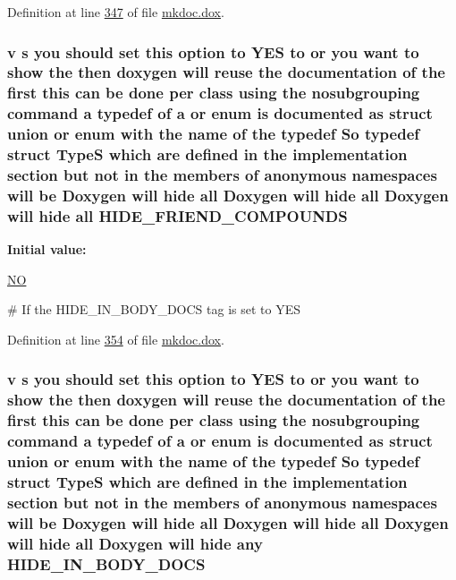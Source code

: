 Definition at line \hyperlink{mkdoc_8dox_source_l00347}{347} of file \hyperlink{mkdoc_8dox_source}{mkdoc.\-dox}.

\hypertarget{mkdoc_8dox_a90cb1e2bfb8402bdac3320203fe5276a}{
\subsubsection[{H\-I\-D\-E\-\_\-\-F\-R\-I\-E\-N\-D\-\_\-\-C\-O\-M\-P\-O\-U\-N\-D\-S}]{\setlength{\rightskip}{0pt plus 5cm}v s you should set this option to Y\-E\-S to or you want to show the then doxygen will reuse the documentation of the first this can be done per class using the nosubgrouping command a typedef of a or enum is documented as {\bf struct} {\bf union} or enum with the name of the typedef So typedef {\bf struct} {\bf Type\-S} which {\bf are} defined in the implementation section but not in the members of anonymous namespaces will be Doxygen will hide all Doxygen will hide all Doxygen will hide all H\-I\-D\-E\-\_\-\-F\-R\-I\-E\-N\-D\-\_\-\-C\-O\-M\-P\-O\-U\-N\-D\-S}}\label{mkdoc_8dox_a90cb1e2bfb8402bdac3320203fe5276a}
{\bfseries Initial value\-:}
\begin{DoxyCode}
 \hyperlink{mkdoc_8dox_a0f6a46245280dc38baf9600906aa1393}{NO}

\textcolor{preprocessor}{# If the HIDE\_IN\_BODY\_DOCS tag is set to YES}
\end{DoxyCode}


Definition at line \hyperlink{mkdoc_8dox_source_l00354}{354} of file \hyperlink{mkdoc_8dox_source}{mkdoc.\-dox}.

\hypertarget{mkdoc_8dox_aac21372812b1ce4b2d16b5121c56fff6}{
\subsubsection[{H\-I\-D\-E\-\_\-\-I\-N\-\_\-\-B\-O\-D\-Y\-\_\-\-D\-O\-C\-S}]{\setlength{\rightskip}{0pt plus 5cm}v s you should set this option to Y\-E\-S to or you want to show the then doxygen will reuse the documentation of the first this can be done per class using the nosubgrouping command a typedef of a or enum is documented as {\bf struct} {\bf union} or enum with the name of the typedef So typedef {\bf struct} {\bf Type\-S} which {\bf are} defined in the implementation section but not in the members of anonymous namespaces will be Doxygen will hide all Doxygen will hide all Doxygen will hide all Doxygen will hide any H\-I\-D\-E\-\_\-\-I\-N\-\_\-\-B\-O\-D\-Y\-\_\-\-D\-O\-C\-S}}\label{mkdoc_8dox_aac21372812b1ce4b2d16b5121c56fff6}


